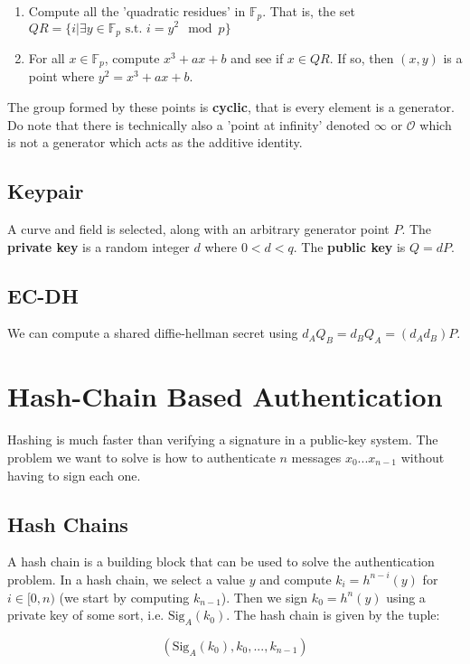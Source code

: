 \documentclass[11pt]{report}
\begin{document}
\begin{enumerate}
	\item Compute all the 'quadratic residues' in $\mathbb{F}_p$. That is, the set $QR = \{i | \exists y \in \mathbb{F}_p \text{ s.t. } i = y^2 \mod{p} \}$
	\item For all $x \in \mathbb{F}_p$, compute $x^3 + ax + b$ and see if $x \in QR$. If so, then $(x, y)$ is a point where $y^2 = x^3 + ax + b$.
\end{enumerate}

The group formed by these points is \textbf{cyclic}, that is every element is a generator. Do note that there is technically also a 'point at infinity' denoted $\infty$ or $\mathcal{O}$ which is not a generator which acts as the additive identity.

\subsection{Keypair}
A curve and field is selected, along with an arbitrary generator point $P$. The \textbf{private key} is a random integer $d$ where $0 < d < q$. The \textbf{public key} is $Q = dP$.

\subsection{EC-DH}
We can compute a shared diffie-hellman secret using $d_AQ_B = d_BQ_A = (d_Ad_B)P$.


\section{Hash-Chain Based Authentication}
Hashing is much faster than verifying a signature in a public-key system. The problem we want to solve is how to authenticate $n$ messages $x_0 ... x_{n-1}$ without having to sign each one.


\subsection{Hash Chains}
A hash chain is a building block that can be used to solve the authentication problem. In a hash chain, we select a value $y$ and compute $k_i = h^{n-i}(y)$ for $i \in [0, n)$ (we start by computing $k_{n-1}$). Then we sign $k_0 = h^{n}(y)$ using a private key of some sort, i.e. $\text{Sig}_{A}(k_0)$. The hash chain is given by the tuple:

\begin{equation}
	(\text{Sig}_{A}(k_0), k_0, ..., k_{n-1})
\end{equation}
\end{document}
